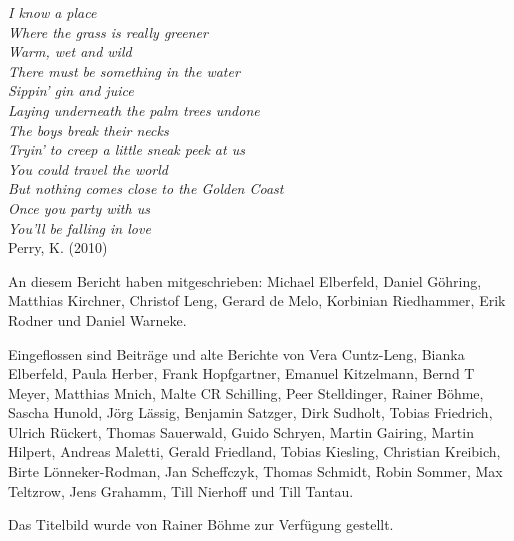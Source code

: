 \documentclass[a4paper]{scrreprt}
\begin{document}
\begin{center}
\textit{I know a place \\
Where the grass is really greener \\
Warm, wet and wild \\
There must be something in the water \\
Sippin' gin and juice \\
Laying underneath the palm trees undone \\
The boys break their necks \\
Tryin' to creep a little sneak peek at us} \\

\textit{You could travel the world \\
But nothing comes close to the Golden Coast \\
Once you party with us \\
You'll be falling in love} \\

Perry, K. (2010)
\end{center}

\vfill

An diesem Bericht haben mitgeschrieben: Michael Elberfeld, Daniel Göhring, Matthias Kirchner, Christof Leng, Gerard de Melo, Korbinian Riedhammer, Erik Rodner und  Daniel Warneke. 

Eingeflossen sind Beiträge und alte Berichte von Vera Cuntz-Leng, Bianka Elberfeld,
Paula Herber, Frank Hopfgartner, Emanuel Kitzelmann, Bernd T Meyer,
Matthias Mnich, Malte CR Schilling, Peer Stelldinger, Rainer Böhme,
Sascha Hunold, Jörg Lässig, Benjamin Satzger, Dirk Sudholt, Tobias
Friedrich, Ulrich Rückert, Thomas Sauerwald, Guido Schryen, Martin
Gairing, Martin Hilpert, Andreas Maletti, Gerald Friedland, Tobias
Kiesling, Christian Kreibich, Birte Lönneker-Rodman, Jan Scheffczyk,
Thomas Schmidt, Robin Sommer, Max Teltzrow, Jens Grahamm, Till
Nierhoff und Till Tantau.

Das Titelbild wurde von Rainer Böhme zur Verfügung gestellt.
\end{document}
